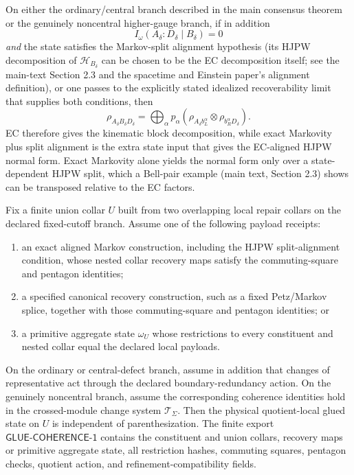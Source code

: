 \begin{corollary}
On either the ordinary/central branch described in the main consensus theorem or the genuinely noncentral
higher-gauge branch, if in addition
\[
I_\omega(A_\delta:D_\delta\mid B_\delta)=0
\]
\emph{and} the state satisfies the Markov-split alignment hypothesis (its HJPW decomposition of
\(\mathcal H_{B_\delta}\) can be chosen to be the EC decomposition itself; see the main-text
Section 2.3 and the spacetime and Einstein paper's alignment definition), or one passes to the explicitly stated
idealized recoverability limit that supplies both conditions, then
\[
\rho_{A_\delta B_\delta D_\delta}
=
\bigoplus_\alpha p_\alpha
\left(\rho_{A_\delta b_L^\alpha}\otimes \rho_{b_R^\alpha D_\delta}\right).
\]
EC therefore gives the kinematic block decomposition, while exact Markovity plus split alignment
is the extra state input that gives the EC-aligned HJPW normal form. Exact Markovity alone yields
the normal form only over a state-dependent HJPW split, which a Bell-pair example (main text,
Section 2.3) shows can be transposed relative to the EC factors.
\end{corollary}

\begin{proposition}\label{prop:assocglue}
Fix a finite union collar \(U\) built from two overlapping local repair collars on the declared
fixed-cutoff branch. Assume one of the following payload receipts:
\begin{enumerate}[label=\textup{(\roman*)},leftmargin=2em]
\item an exact aligned Markov construction, including the HJPW split-alignment condition, whose
nested collar recovery maps satisfy the commuting-square and pentagon identities;
\item a specified canonical recovery construction, such as a fixed Petz/Markov splice, together
with those commuting-square and pentagon identities; or
\item a primitive aggregate state \(\omega_U\) whose restrictions to every constituent and nested
collar equal the declared local payloads.
\end{enumerate}
On the ordinary or central-defect branch, assume in addition that changes of representative act
through the declared boundary-redundancy action. On the genuinely noncentral branch, assume the
corresponding coherence identities hold in the crossed-module change system
\(\mathcal T_\Sigma\). Then the physical quotient-local glued state on \(U\) is independent of
parenthesization. The finite export
\(\mathsf{GLUE\text{-}COHERENCE\text{-}1}\) contains the constituent and union collars,
recovery maps or primitive aggregate state, all restriction hashes, commuting squares, pentagon
checks, quotient action, and refinement-compatibility fields.
\end{proposition}

